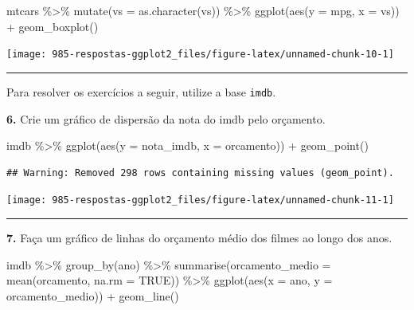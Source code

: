 \documentclass[
]{book}
\newenvironment{Shaded}{\begin{snugshade}}{\end{snugshade}}
\newcommand{\AttributeTok}[1]{\textcolor[rgb]{0.77,0.63,0.00}{#1}}
\newcommand{\ConstantTok}[1]{\textcolor[rgb]{0.00,0.00,0.00}{#1}}
\newcommand{\FunctionTok}[1]{\textcolor[rgb]{0.00,0.00,0.00}{#1}}
\newcommand{\NormalTok}[1]{#1}
\newcommand{\SpecialCharTok}[1]{\textcolor[rgb]{0.00,0.00,0.00}{#1}}
\begin{document}
\begin{Shaded}
\begin{Highlighting}[]
\NormalTok{mtcars }\SpecialCharTok{\%\textgreater{}\%} 
  \FunctionTok{mutate}\NormalTok{(}\AttributeTok{vs =} \FunctionTok{as.character}\NormalTok{(vs)) }\SpecialCharTok{\%\textgreater{}\%} 
  \FunctionTok{ggplot}\NormalTok{(}\FunctionTok{aes}\NormalTok{(}\AttributeTok{y =}\NormalTok{ mpg, }\AttributeTok{x =}\NormalTok{ vs)) }\SpecialCharTok{+}
  \FunctionTok{geom\_boxplot}\NormalTok{()}
\end{Highlighting}
\end{Shaded}

\begin{center}\texttt{[image: 985-respostas-ggplot2\_files/figure-latex/unnamed-chunk-10-1]} \end{center}

\begin{center}\rule{0.5\linewidth}{0.5pt}\end{center}

Para resolver os exercícios a seguir, utilize a base \texttt{imdb}.

\textbf{6.} Crie um gráfico de dispersão da nota do imdb pelo orçamento.

\begin{Shaded}
\begin{Highlighting}[]
\NormalTok{imdb }\SpecialCharTok{\%\textgreater{}\%} 
  \FunctionTok{ggplot}\NormalTok{(}\FunctionTok{aes}\NormalTok{(}\AttributeTok{y =}\NormalTok{ nota\_imdb, }\AttributeTok{x =}\NormalTok{ orcamento)) }\SpecialCharTok{+}
  \FunctionTok{geom\_point}\NormalTok{()}
\end{Highlighting}
\end{Shaded}

\begin{verbatim}
## Warning: Removed 298 rows containing missing values (geom_point).
\end{verbatim}

\begin{center}\texttt{[image: 985-respostas-ggplot2\_files/figure-latex/unnamed-chunk-11-1]} \end{center}

\begin{center}\rule{0.5\linewidth}{0.5pt}\end{center}

\textbf{7.} Faça um gráfico de linhas do orçamento médio dos filmes ao longo dos anos.

\begin{Shaded}
\begin{Highlighting}[]
\NormalTok{imdb }\SpecialCharTok{\%\textgreater{}\%} 
  \FunctionTok{group\_by}\NormalTok{(ano) }\SpecialCharTok{\%\textgreater{}\%} 
  \FunctionTok{summarise}\NormalTok{(}\AttributeTok{orcamento\_medio =} \FunctionTok{mean}\NormalTok{(orcamento, }\AttributeTok{na.rm =} \ConstantTok{TRUE}\NormalTok{)) }\SpecialCharTok{\%\textgreater{}\%} 
  \FunctionTok{ggplot}\NormalTok{(}\FunctionTok{aes}\NormalTok{(}\AttributeTok{x =}\NormalTok{ ano, }\AttributeTok{y =}\NormalTok{ orcamento\_medio)) }\SpecialCharTok{+}
  \FunctionTok{geom\_line}\NormalTok{()}
\end{Highlighting}
\end{Shaded}
\end{document}
